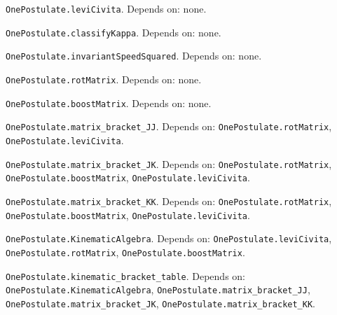 \begin{definition}\label{OnePostulate.leviCivita}
\texttt{OnePostulate.leviCivita}. Depends on: none.
\end{definition}

\begin{definition}\label{OnePostulate.classifyKappa}
\texttt{OnePostulate.classifyKappa}. Depends on: none.
\end{definition}

\begin{definition}\label{OnePostulate.invariantSpeedSquared}
\texttt{OnePostulate.invariantSpeedSquared}. Depends on: none.
\end{definition}

\begin{definition}\label{OnePostulate.rotMatrix}
\texttt{OnePostulate.rotMatrix}. Depends on: none.
\end{definition}

\begin{definition}\label{OnePostulate.boostMatrix}
\texttt{OnePostulate.boostMatrix}. Depends on: none.
\end{definition}

\begin{lemma}\label{OnePostulate.matrix_bracket_JJ}
\texttt{OnePostulate.matrix\_bracket\_JJ}. Depends on: \texttt{OnePostulate.rotMatrix}, \texttt{OnePostulate.leviCivita}.
\end{lemma}

\begin{lemma}\label{OnePostulate.matrix_bracket_JK}
\texttt{OnePostulate.matrix\_bracket\_JK}. Depends on: \texttt{OnePostulate.rotMatrix}, \texttt{OnePostulate.boostMatrix}, \texttt{OnePostulate.leviCivita}.
\end{lemma}

\begin{lemma}\label{OnePostulate.matrix_bracket_KK}
\texttt{OnePostulate.matrix\_bracket\_KK}. Depends on: \texttt{OnePostulate.rotMatrix}, \texttt{OnePostulate.boostMatrix}, \texttt{OnePostulate.leviCivita}.
\end{lemma}

\begin{definition}\label{OnePostulate.KinematicAlgebra}
\texttt{OnePostulate.KinematicAlgebra}. Depends on: \texttt{OnePostulate.leviCivita}, \texttt{OnePostulate.rotMatrix}, \texttt{OnePostulate.boostMatrix}.
\end{definition}

\begin{lemma}\label{OnePostulate.kinematic_bracket_table}
\texttt{OnePostulate.kinematic\_bracket\_table}. Depends on: \texttt{OnePostulate.KinematicAlgebra}, \texttt{OnePostulate.matrix\_bracket\_JJ}, \texttt{OnePostulate.matrix\_bracket\_JK}, \texttt{OnePostulate.matrix\_bracket\_KK}.
\end{lemma}


